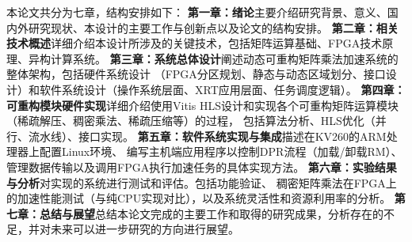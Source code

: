 本论文共分为七章，结构安排如下：
\textbf{第一章：绪论}主要介绍研究背景、意义、国内外研究现状、本设计的主要工作与创新点以及论文的结构安排。
\textbf{第二章：相关技术概述}详细介绍本设计所涉及的关键技术，包括矩阵运算基础、FPGA技术原理、异构计算系统。
\textbf{第三章：系统总体设计}阐述动态可重构矩阵乘法加速系统的整体架构，包括硬件系统设计
（FPGA分区规划、静态与动态区域划分、接口设计）和软件系统设计（操作系统层面、XRT应用层面、任务调度逻辑）。
\textbf{第四章：可重构模块硬件实现}详细介绍使用Vitis HLS设计和实现各个可重构矩阵运算模块（稀疏解压、稠密乘法、稀疏压缩等）的过程，
包括算法分析、HLS优化（并行、流水线）、接口实现。
\textbf{第五章：软件系统实现与集成}描述在KV260的ARM处理器上配置Linux环境、
编写主机端应用程序以控制DPR流程（加载/卸载RM）、管理数据传输以及调用FPGA执行加速任务的具体实现方法。
\textbf{第六章：实验结果与分析}对实现的系统进行测试和评估。包括功能验证、
稠密矩阵乘法在FPGA上的加速性能测试（与纯CPU实现对比），以及系统灵活性和资源利用率的分析。
\textbf{第七章：总结与展望}总结本论文完成的主要工作和取得的研究成果，分析存在的不足，并对未来可以进一步研究的方向进行展望。
